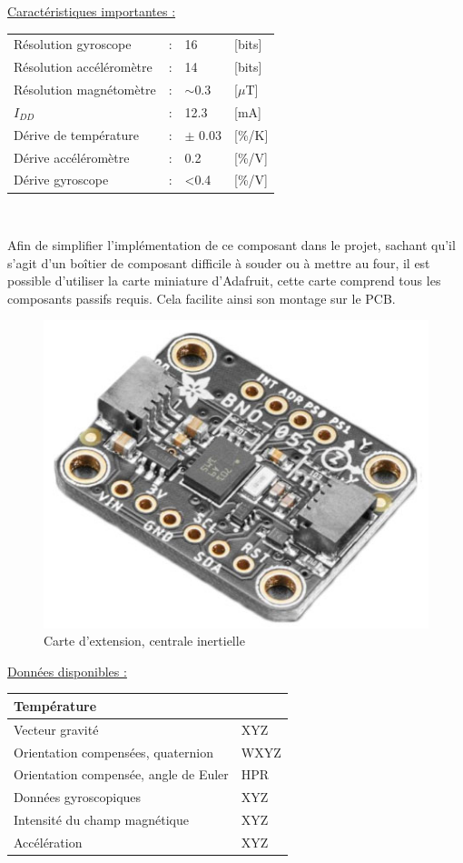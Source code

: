 \begin{center}
	\underline{Caractéristiques importantes :} \\
	\begin{tabular}{l l l l}
		Résolution gyroscope & : & 16 & [bits] \\
		Résolution accéléromètre & : & 14 & [bits] \\
		Résolution magnétomètre & : & $\sim$0.3 & [$\mu$T] \\
		$I_{DD}$ & : & 12.3 & [mA] \\
		Dérive de température & : & $\pm$ 0.03 & [\%/K] \\ 
		Dérive accéléromètre & : & 0.2 & [\%/V] \\
		Dérive gyroscope & : & <0.4 & [\%/V]
	\end{tabular} \\
\end{center}

Afin de simplifier l'implémentation de ce composant dans le projet, sachant qu'il s'agit d'un boîtier de composant difficile à souder ou à mettre au four, il est possible d'utiliser la carte miniature d'Adafruit, cette carte comprend tous les composants passifs requis. Cela facilite ainsi son montage sur le PCB.

\begin{figure}[h]
	\centering
	\includegraphics[width=0.45\linewidth]{../figures/pre_etude/BNO055_Adafruit}
	\caption{Carte d'extension, centrale inertielle}
	\label{fig:bno055adafruit}
\end{figure}

\underline{Données disponibles :}

\begin{center}
	\begin{tabular}{|ll|}
		\hline
		Température & \\
		\hline
		Vecteur gravité & XYZ \\
		\hline
		Orientation compensées, quaternion & WXYZ \\
		\hline
		Orientation compensée, angle de Euler & HPR \\
		\hline
		Données gyroscopiques & XYZ \\
		\hline
		 Intensité du champ magnétique & XYZ \\
		\hline
		Accélération & XYZ \\
		\hline
	\end{tabular}
\end{center}

